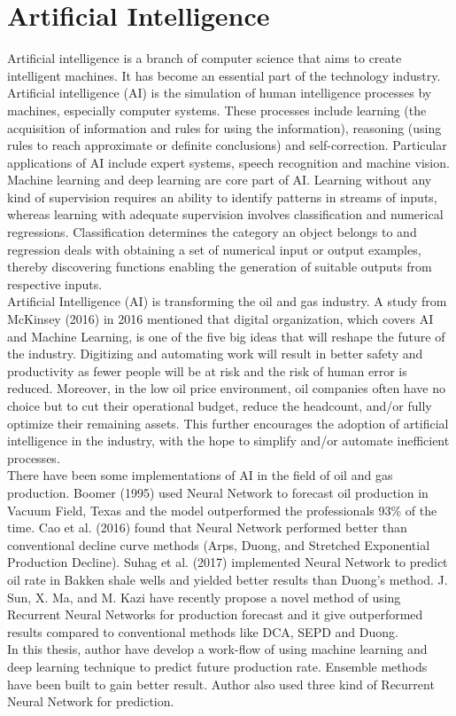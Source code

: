\documentclass[12pt,a4paper]{report}
\begin{document}
\chapter{Artificial Intelligence}
\label{sec:headings}
Artificial intelligence is a branch of computer science that aims to create intelligent machines. It has become an essential part of the technology industry. Artificial intelligence (AI) is the simulation of human intelligence processes by machines, especially computer systems. These processes include learning (the acquisition of information and rules for using the information), reasoning (using rules to reach approximate or definite conclusions) and self-correction. Particular applications of AI include expert systems, speech recognition and machine vision.\\
Machine learning and deep learning are core part of AI. Learning without any kind of supervision requires an ability to identify patterns in streams of inputs, whereas learning with adequate supervision involves classification and numerical regressions. Classification determines the category an object belongs to and regression deals with obtaining a set of numerical input or output examples, thereby discovering functions enabling the generation of suitable outputs from respective inputs.\\
Artificial Intelligence (AI) is transforming the oil and gas industry. A study from McKinsey (2016) in 2016 mentioned that digital organization, which covers AI and Machine Learning, is one of the five big ideas that will reshape the future of the industry. Digitizing and automating work will result in better safety and productivity as fewer people will be at risk and the risk of human error is reduced. Moreover, in the low oil price environment, oil companies often have no choice but to cut their operational budget, reduce the headcount, and/or fully optimize their remaining assets. This further encourages the adoption of artificial intelligence in the industry, with the hope to simplify and/or automate inefficient processes\cite{Ristanto}.\\
There have been some implementations of AI in the field of oil and gas production. Boomer (1995) \cite{Boomer}used Neural Network to forecast oil production in Vacuum Field, Texas and the model outperformed the professionals 93\% of the time. Cao et al. (2016) found that Neural Network performed better than conventional decline curve methods (Arps, Duong, and Stretched Exponential Production Decline). Suhag et al. (2017) \cite{Suhag} implemented Neural Network to predict oil rate in Bakken shale wells and yielded better results than Duong’s method. J. Sun, X. Ma, and M. Kazi \cite{Sun} have recently propose a novel method of using Recurrent Neural Networks for production forecast and it give outperformed results compared to conventional methods like DCA, SEPD and Duong.\\
In this thesis, author have develop a work-flow of using machine learning and deep learning technique to predict future production rate. Ensemble methods have been built to gain better result. Author also used three kind of Recurrent Neural Network for prediction.
\end{document}
